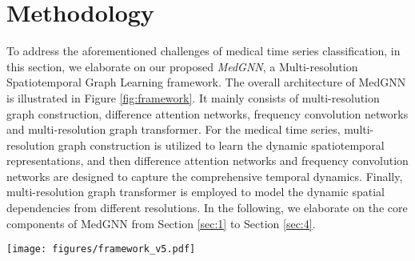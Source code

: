 \vspace{-1mm}
\section{Methodology}
To address the aforementioned challenges of medical time series classification, in this section, we elaborate on our proposed \textit{MedGNN}, a Multi-resolution Spatiotemporal Graph Learning framework.
The overall architecture of MedGNN is illustrated in Figure \ref{fig:framework}. It mainly consists of multi-resolution graph construction, difference attention networks, frequency convolution networks and multi-resolution graph transformer. For the medical time series, multi-resolution graph construction is utilized to learn the dynamic spatiotemporal representations, and then difference attention networks and frequency convolution networks are designed to capture the comprehensive temporal dynamics. Finally, multi-resolution graph transformer is employed to model the dynamic spatial dependencies from different resolutions.
In the following, %
we elaborate on the core components of MedGNN from Section \ref{sec:1} to Section \ref{sec:4}.%

\begin{figure*}[!t]
    \centering
    \texttt{[image: figures/framework\_v5.pdf]}
    \vspace{-2mm}
    \caption{The overall architecture of MedGNN. (a) Multi-resolution graph construction is utilized to learn the dynamic spatiotemporal representations. (b) Frequency convolution networks are applied to provide a multi-view perspective of the temporal dynamics by applying convolutions in the frequency domain. (c) Difference attention networks are employed to capture key temporal patterns while mitigating the impact of baseline wander. (d) Multi-resolution graph transformer is leveraged to model the dynamic spatial dependencies and and fuse the information from different resolutions.}
    \label{fig:framework}
    \vspace{-2mm}
\end{figure*}

